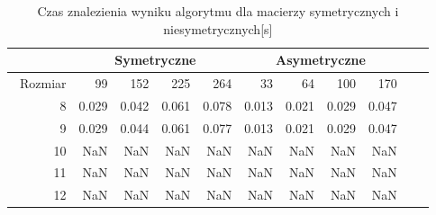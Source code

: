\begin{table}
\centering
\begin{tabular}{|r|r|r|r|r|r|r|r|r|r|r|}
\hline
 & \multicolumn{4}{|c|}{Symetryczne} & \multicolumn{4}{|c|}{Asymetryczne} \\ \hline\
Rozmiar & 99 & 152 & 225 & 264 & 33 & 64 & 100 & 170 \\ \hline
8 & 0.029 & 0.042 & 0.061 & 0.078 & 0.013 & 0.021 & 0.029 & 0.047 \\
9 & 0.029 & 0.044 & 0.061 & 0.077 & 0.013 & 0.021 & 0.029 & 0.047 \\
10 & NaN & NaN & NaN & NaN & NaN & NaN & NaN & NaN \\
11 & NaN & NaN & NaN & NaN & NaN & NaN & NaN & NaN \\
12 & NaN & NaN & NaN & NaN & NaN & NaN & NaN & NaN \\ \hline
\end{tabular}
\caption{Czas znalezienia wyniku algorytmu dla macierzy symetrycznych i niesymetrycznych[s]}
\label{tab:time_AnStartVal}
\end{table}

